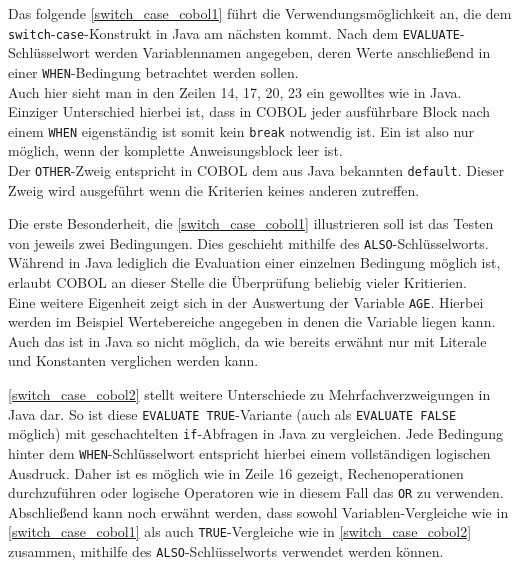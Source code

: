 Das folgende \autoref{switch_case_cobol1} führt die Verwendungsmöglichkeit an, die dem \texttt{switch}-\texttt{case}-Konstrukt in Java am nächsten kommt. Nach dem \texttt{EVALUATE}-Schlüsselwort werden Variablennamen angegeben, deren Werte anschließend in einer \texttt{WHEN}-Bedingung betrachtet werden sollen.\\

Auch hier sieht man in den Zeilen 14, 17, 20, 23 ein gewolltes  wie in Java. Einziger Unterschied hierbei ist, dass in COBOL jeder ausführbare Block nach einem \texttt{WHEN} eigenständig ist somit kein \texttt{break} notwendig ist. Ein  ist also nur möglich, wenn der komplette Anweisungsblock leer ist. \\

Der \texttt{OTHER}-Zweig entspricht in COBOL dem aus Java bekannten \texttt{default}. Dieser Zweig wird ausgeführt wenn die Kriterien keines anderen zutreffen.


Die erste Besonderheit, die \autoref{switch_case_cobol1} illustrieren soll ist das Testen von jeweils zwei Bedingungen. Dies geschieht mithilfe des \texttt{ALSO}-Schlüsselworts. Während in Java lediglich die Evaluation einer einzelnen Bedingung möglich ist, erlaubt COBOL an dieser Stelle die Überprüfung beliebig vieler Kritierien.\\

Eine weitere Eigenheit zeigt sich in der Auswertung der Variable \texttt{AGE}. Hierbei werden im Beispiel Wertebereiche angegeben in denen die Variable liegen kann. Auch das ist in Java so nicht möglich, da wie bereits erwähnt nur mit Literale und Konstanten verglichen werden kann.


\autoref{switch_case_cobol2} stellt weitere Unterschiede zu Mehrfachverzweigungen in Java dar. So ist diese \texttt{EVALUATE TRUE}-Variante (auch als \texttt{EVALUATE FALSE} möglich) mit geschachtelten \texttt{if}-Abfragen in Java zu vergleichen. Jede Bedingung hinter dem \texttt{WHEN}-Schlüsselwort entspricht hierbei einem vollständigen logischen Ausdruck. Daher ist es möglich wie in Zeile 16 gezeigt, Rechenoperationen durchzuführen oder logische Operatoren wie in diesem Fall das \texttt{OR} zu verwenden. \\

Abschließend kann noch erwähnt werden, dass sowohl Variablen-Vergleiche wie in \autoref{switch_case_cobol1} als auch \texttt{TRUE}-Vergleiche wie in \autoref{switch_case_cobol2} zusammen, mithilfe des \texttt{ALSO}-Schlüsselworts verwendet werden können.